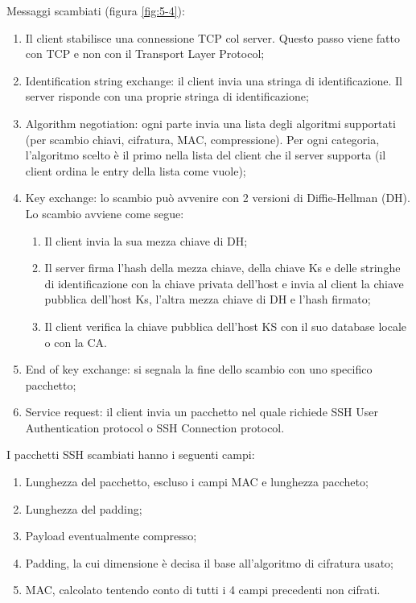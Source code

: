 Messaggi scambiati (figura \ref{fig:5-4}):
\begin{enumerate}
    \item Il client stabilisce una connessione TCP col server. Questo passo viene fatto con TCP e non con il Transport Layer Protocol;
	\item Identification string exchange: il client invia una stringa di identificazione. Il server risponde con una proprie stringa di identificazione;
	\item Algorithm negotiation: ogni parte invia una lista degli algoritmi supportati (per scambio chiavi, cifratura, MAC, compressione). Per ogni categoria, l'algoritmo scelto è il primo nella lista del client che il server supporta (il client ordina le entry della lista come vuole);
	\item Key exchange: lo scambio può avvenire con 2 versioni di Diffie-Hellman (DH). Lo scambio avviene come segue:
	\begin{enumerate}
	    \item Il client invia la sua mezza chiave di DH;
		\item Il server firma l'hash della mezza chiave, della chiave Ks e delle stringhe di identificazione con la chiave privata dell'host e invia al client la chiave pubblica dell'host Ks, l'altra mezza chiave di DH e l'hash firmato;
		\item Il client verifica la chiave pubblica dell'host KS con il suo database locale o con la CA.
	\end{enumerate}
	\item End of key exchange: si segnala la fine dello scambio con uno specifico pacchetto;
	\item Service request: il client invia un pacchetto nel quale richiede SSH User Authentication protocol o SSH Connection protocol.
\end{enumerate}

I pacchetti SSH scambiati hanno i seguenti campi:
\begin{enumerate}
    \item Lunghezza del pacchetto, escluso i campi MAC e lunghezza paccheto;
	\item Lunghezza del padding;
	\item Payload eventualmente compresso;
	\item Padding, la cui dimensione è decisa il base all'algoritmo di cifratura usato;
	\item MAC, calcolato tentendo conto di tutti i 4 campi precedenti non cifrati.
\end{enumerate}

